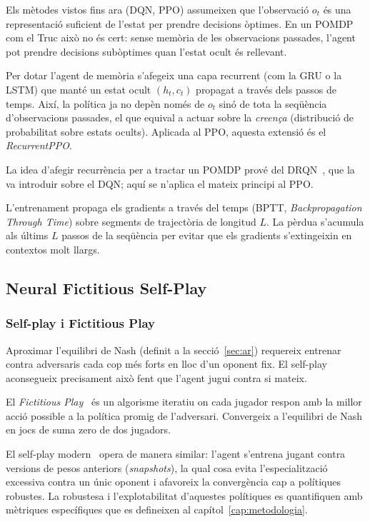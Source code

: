 Els mètodes vistos fins ara (\ac{DQN}, \ac{PPO}) assumeixen que l'observació $o_t$ és una
representació suficient de l'estat per prendre decisions òptimes. En un \ac{POMDP} com el
Truc això no és cert: sense memòria de les observacions passades, l'agent pot prendre
decisions subòptimes quan l'estat ocult és rellevant.

Per dotar l'agent de memòria s'afegeix una capa recurrent (com la \acf{GRU} o la
\acs{LSTM}) que manté un estat ocult $(h_t, c_t)$ propagat a través dels passos de temps.
Així, la política ja no depèn només de $o_t$ sinó de tota la seqüència d'observacions
passades, el que equival a actuar sobre la \emph{creença} (distribució de probabilitat
sobre estats ocults). Aplicada al \ac{PPO}, aquesta extensió és el \emph{RecurrentPPO}. 

La idea d'afegir recurrència per a tractar un \ac{POMDP}
prové del \acf{DRQN}~\cite{hausknecht2015drqn}, que la va introduir sobre el \ac{DQN}; aquí
se n'aplica el mateix principi al \ac{PPO}.

L'entrenament propaga els gradients a través del temps (BPTT,
\emph{Backpropagation Through Time}) sobre segments de trajectòria de longitud $L$. La
pèrdua s'acumula als últims $L$ passos de la seqüència per evitar que els gradients
s'extingeixin en contextos molt llargs.

\subsection{Neural Fictitious Self-Play}
\label{sec:nfsp}

\subsubsection*{Self-play i Fictitious Play}

Aproximar l'equilibri de Nash (definit a la secció~\ref{sec:ar}) requereix
entrenar contra adversaris cada cop més forts en lloc d'un oponent fix. El
self-play aconsegueix precisament això fent que l'agent jugui contra si mateix.

El \emph{Fictitious Play}~\cite{brown1951fictitious} és un algorisme iteratiu on cada
jugador respon amb la millor acció possible a la política promig de l'adversari.
Convergeix a l'equilibri de Nash en jocs de suma zero de dos jugadors.

El self-play modern~\cite{brown2019pluribus} opera de manera similar: l'agent
s'entrena jugant contra versions de pesos anteriors (\emph{snapshots}), la
qual cosa evita l'especialització excessiva contra un únic oponent i afavoreix
la convergència cap a polítiques robustes. La robustesa i l'explotabilitat
d'aquestes polítiques es quantifiquen amb mètriques específiques que es defineixen
al capítol~\ref{cap:metodologia}.

